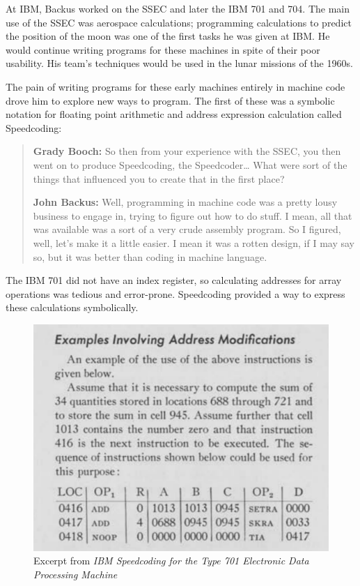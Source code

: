 At IBM, Backus worked on the SSEC and later the IBM 701 and 704. The main use
of the SSEC was aerospace calculations; programming calculations to predict the
position of the moon was one of the first tasks he was given at IBM. He would
continue writing programs for these machines in spite of their poor usability.
His team's techniques would be used in the lunar missions of the 1960s.

The pain of writing programs for these early machines entirely in machine code
drove him to explore new ways to program. The first of these was a symbolic
notation for floating point arithmetic and address expression calculation
called Speedcoding\cite{backus_oral_history_2006}:

\begin{quotation}
	\textbf{Grady Booch:}
	So then from your experience with the SSEC, you then went on to
	produce Speedcoding, the
	Speedcoder\dots
	What were sort of the things that influenced you to create that in
	the first place?

	\textbf{John Backus:}
	Well, programming in machine code was a pretty lousy business to
	engage in, trying to figure
	out how to do stuff. I mean, all that was available was a sort of a
	very crude assembly program. So I
	figured, well, let's make it a little easier. I mean it was a
	rotten design, if I may say so, but it was better
	than coding in machine language.
\end{quotation}

The IBM 701 did not have an index register, so calculating addresses for array
operations was tedious and error-prone. Speedcoding provided a way to express
these calculations symbolically.

\begin{figure}[h!]
	\centering
	\includegraphics[width=0.5\linewidth]{resource/ibm-speedcoding-example.png}
	\caption{Excerpt from \textit{IBM Speedcoding for the Type 701
			Electronic Data Processing Machine}
		\cite{IBM_1954_Speedcoding}}
	\label{fig:ibm-speedcoding-example}
\end{figure}

